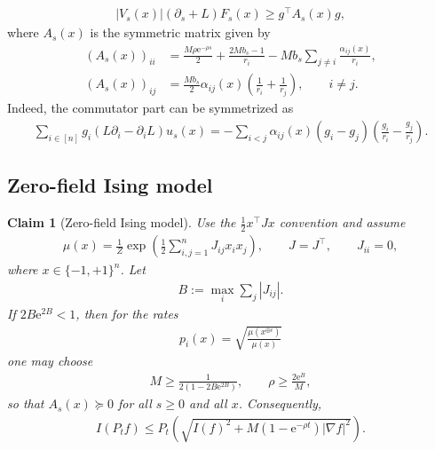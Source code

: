 \documentclass[11pt]{article}
\theoremstyle{plain}
\newtheorem{claim}[theorem]{Claim}
\theoremstyle{definition}
\theoremstyle{remark}
\newcommand{\e}{\mathrm{e}}
\newcommand{\tuple}[1]{\left(#1\right)}
\newcommand{\tp}{\tuple}
\newcommand{\abs}[1]{\left\vert#1\right\vert}
\begin{document}
\begin{align*}
    \abs{V_s(x)}(\partial_s+L)F_s(x)
    \ge g^\intercal A_s(x)g,
\end{align*}
where $A_s(x)$ is the symmetric matrix given by
\begin{align*}
    (A_s(x))_{ii}
    &=
    \frac{M\rho\e^{-\rho s}}{2}
    +\frac{2Mb_s-1}{r_i}
    -Mb_s\sum_{j\neq i}\frac{\alpha_{ij}(x)}{r_i},
    \\
    (A_s(x))_{ij}
    &=
    \frac{Mb_s}{2}\alpha_{ij}(x)
    \tp{\frac{1}{r_i}+\frac{1}{r_j}},
    \qquad i\neq j.
\end{align*}
Indeed, the commutator part can be symmetrized as
\begin{align*}
    \sum_{i \in [n]}g_i(L\partial_i-\partial_i L)u_s(x)
    =
    -\sum_{i<j}\alpha_{ij}(x)
    \tp{g_i-g_j}
    \tp{\frac{g_i}{r_i}-\frac{g_j}{r_j}}.
\end{align*}


\subsection{Zero-field Ising model}

\begin{claim}[Zero-field Ising model]
Use the $\frac12 x^\intercal Jx$ convention and assume
\begin{align*}
    \mu(x)=\frac{1}{Z}\exp\tp{\frac12\sum_{i,j=1}^n J_{ij}x_ix_j},
    \qquad J=J^\intercal,\qquad J_{ii}=0,
\end{align*}
where $x\in\{-1,+1\}^n$. Let
\begin{align*}
    B:=\max_i\sum_j |J_{ij}|.
\end{align*}
If $2B\e^{2B}<1$, then for the rates
\begin{align*}
    p_i(x)=\sqrt{\frac{\mu(x^{\oplus i})}{\mu(x)}}
\end{align*}
one may choose
\begin{align*}
    M\ge \frac{1}{2(1-2B\e^{2B})},
    \qquad
    \rho\ge \frac{2\e^B}{M},
\end{align*}
so that $A_s(x)\succeq0$ for all $s\ge0$ and all $x$. Consequently,
\begin{align*}
    I(P_t f)
    \le
    P_t\tp{\sqrt{I(f)^2+M\tp{1-\e^{-\rho t}}\abs{\nabla f}^2}}.
\end{align*}
\end{claim}
\end{document}
